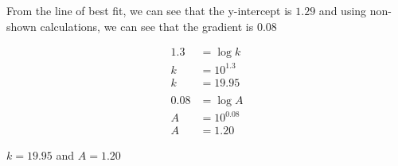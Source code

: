 {{		From the line of best fit, we can see that the y-intercept is \(1.29\) and using non-shown calculations, we can see that the gradient is \(0.08\)
		
		\begin{align*}
			1.3 &= \log{k} \\
			k &= 10^{1.3} \\
			k &= 19.95 \\ \\
			0.08 &= \log{A} \\
			A &= 10^{0.08} \\
			A &= 1.20
		\end{align*}
	
		\(k = 19.95\) and \(A = 1.20\)
	}
}
